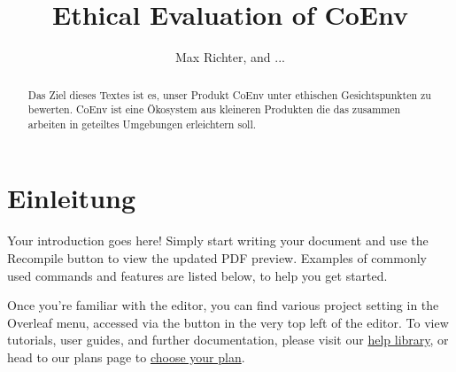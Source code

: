 \documentclass{article}
\title{Ethical Evaluation of CoEnv}
\author{Max Richter, and ...}
\begin{document}
\maketitle

\begin{abstract}
  Das Ziel dieses Textes ist es, unser Produkt CoEnv unter ethischen Gesichtspunkten zu bewerten. CoEnv ist eine Ökosystem aus kleineren Produkten die das zusammen arbeiten in geteiltes Umgebungen erleichtern soll.
\end{abstract}

\section{Einleitung}

Your introduction goes here! Simply start writing your document and use the Recompile button to view the updated PDF preview. Examples of commonly used commands and features are listed below, to help you get started.

Once you're familiar with the editor, you can find various project setting in the Overleaf menu, accessed via the button in the very top left of the editor. To view tutorials, user guides, and further documentation, please visit our \href{https://www.overleaf.com/learn}{help library}, or head to our plans page to \href{https://www.overleaf.com/user/subscription/plans}{choose your plan}.
\end{document}
